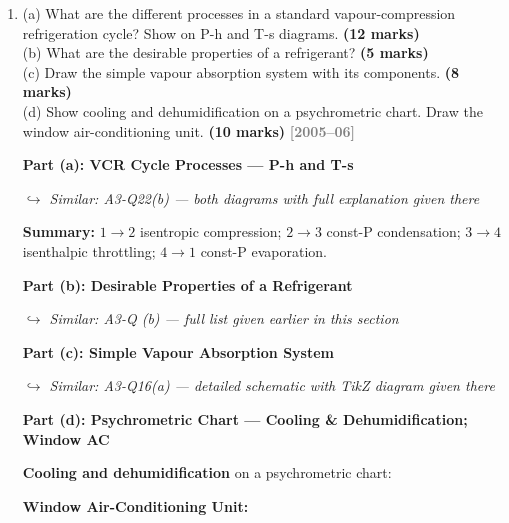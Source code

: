 \documentclass[12pt,a3paper]{article}
\newcommand{\yr}[1]{\hfill\textcolor{gray}{\small\textbf{[#1]}}}
\newcommand{\mk}[1]{\textcolor{orange!70!black}{\small\textbf{(#1 marks)}}}
\newcommand{\variant}[1]{\par\vspace{1pt}\textcolor{blue!50!black}%
  {\footnotesize\textit{$\hookrightarrow$ Similar: #1}}}
\begin{document}
\begin{enumerate}
\begin{tcolorbox}[enhanced,breakable,ansbox,colback=cC!4,colframe=cC,
  boxrule=0.8pt,arc=5pt,
  title={\textbf{Answer}},fonttitle=\bfseries\color{white},colbacktitle=cC]
Process: Hot, humid outside air → filter → cooling coil (cooled below
dew point — moisture condenses out → cooling and dehumidification) →
optional re-heating to required supply temperature → fan → spaces.
Return air recirculates back to AHU.

\end{tcolorbox}


\item \label{qlabel:A3-Q31}
(a) What are the different processes in a standard vapour-compression refrigeration cycle? Show on P-h and T-s diagrams. \mk{12}\\
(b) What are the desirable properties of a refrigerant? \mk{5}\\
(c) Draw the simple vapour absorption system with its components. \mk{8}\\
(d) Show cooling and dehumidification on a psychrometric chart. Draw the window air-conditioning unit. \mk{10}
\yr{2005--06}



\begin{tcolorbox}[enhanced,breakable,ansbox,colback=cC!4,colframe=cC,
  boxrule=0.8pt,arc=5pt,
  title={\textbf{Answer}},fonttitle=\bfseries\color{white},colbacktitle=cC]

\textbf{Part (a): VCR Cycle Processes — P-h and T-s}

\variant{A3-Q22(b) — both diagrams with full explanation given there}

\textbf{Summary:} $1\to2$ isentropic compression; $2\to3$ const-P condensation;
$3\to4$ isenthalpic throttling; $4\to1$ const-P evaporation.

\hrulefill

\textbf{Part (b): Desirable Properties of a Refrigerant}

\variant{A3-Q (b) — full list given earlier in this section}

\hrulefill

\textbf{Part (c): Simple Vapour Absorption System}

\variant{A3-Q16(a) — detailed schematic with TikZ diagram given there}

\hrulefill

\textbf{Part (d): Psychrometric Chart — Cooling \& Dehumidification; Window AC}

\textbf{Cooling and dehumidification} on a psychrometric chart:

\medskip

\textbf{Window Air-Conditioning Unit:}



\end{tcolorbox}
\end{enumerate}
\end{document}
